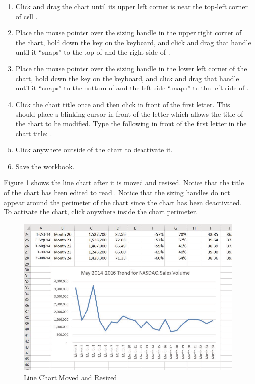 \begin{enumerate}
	\item Click and drag the chart until its upper left corner is near the top-left corner of cell .
	\item Place the mouse pointer over the sizing handle in the upper right corner of the chart, hold down the  key on the keyboard, and click and drag that handle until it ``snaps'' to the top of  and the right side of .
	\item Place the mouse pointer over the sizing handle in the lower left corner of the chart, hold down the  key on the keyboard, and click and drag that handle until it ``snaps'' to the bottom of  and the left side ``snaps'' to the left side of .
	\item Click the chart title once and then click in front of the first letter. This should place a blinking cursor in front of the letter which allows the title of the chart to be modified. Type the following in front of the first letter in the chart title: .
	\item Click anywhere outside of the chart to deactivate it.
	\item Save the  workbook.
\end{enumerate}

Figure \ref{04:fig04} shows the line chart after it is moved and resized. Notice that the title of the chart has been edited to read . Notice that the sizing handles do not appear around the perimeter of the chart since the chart has been deactivated. To activate the chart, click anywhere inside the chart perimeter.

\begin{figure}[H]
	\centering
	\includegraphics[width=\maxwidth{.95\linewidth}]{gfx/ch04_fig04}
	\caption{Line Chart Moved and Resized}
	\label{04:fig04}
\end{figure}

